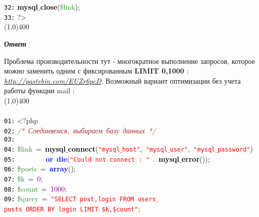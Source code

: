 \documentclass[a4paper,12pt]{article}
\begin{document}
\mbox{}\texttt{\textcolor{Black}{32:}} \textbf{\textcolor{Black}{mysql$\_$close}}\textcolor{BrickRed}{(}\textcolor{ForestGreen}{\$link}\textcolor{BrickRed}{);} \\
\mbox{}\texttt{\textcolor{Black}{33:}} \textcolor{BrickRed}{?\textgreater{}} \\
\line(1,0){400}
\begin{center}
\textit{\textbf{Ответ}}
\end{center}
Проблема производительности тут - многократное выполнение запросов, которое можно заменить одним с фиксированным \textbf{LIMIT 0,1000} : \href{http://pastebin.com/EUZr6pcD}{\textit{http://pastebin.com/EUZr6pcD}}.
Возможный вариант оптимизации без учета работы функции mail :
\\
\line(1,0){400}
\\
\\
\noindent
\mbox{}\texttt{\textcolor{Black}{01:}} \textcolor{BrickRed}{\textless{}?php} \\
\mbox{}\texttt{\textcolor{Black}{02:}} \textit{\textcolor{Brown}{/*\ Соединяемся,\ выбираем\ базу\ данных\ */}} \\
\mbox{}\texttt{\textcolor{Black}{03:}}  \\
\mbox{}\texttt{\textcolor{Black}{04:}} \textcolor{ForestGreen}{\$link}\ \textcolor{BrickRed}{=}\ \textbf{\textcolor{Black}{mysql$\_$connect}}\textcolor{BrickRed}{(}\texttt{\textcolor{Red}{"{}mysql$\_$host"{}}}\textcolor{BrickRed}{,}\ \texttt{\textcolor{Red}{"{}mysql$\_$user"{}}}\textcolor{BrickRed}{,}\ \texttt{\textcolor{Red}{"{}mysql$\_$password"{}}}\textcolor{BrickRed}{)} \\
\mbox{}\texttt{\textcolor{Black}{05:}} \ \ \ \ \ \ \ \ \textbf{\textcolor{Blue}{or}}\ \textbf{\textcolor{Blue}{die}}\textcolor{BrickRed}{(}\texttt{\textcolor{Red}{"{}Could\ not\ connect\ :\ "{}}}\ \textcolor{BrickRed}{.}\ \textbf{\textcolor{Black}{mysql$\_$error}}\textcolor{BrickRed}{());} \\
\mbox{}\texttt{\textcolor{Black}{06:}} \textcolor{ForestGreen}{\$posts}\ \textcolor{BrickRed}{=}\ \textbf{\textcolor{Blue}{array}}\textcolor{BrickRed}{();} \\
\mbox{}\texttt{\textcolor{Black}{07:}} \textcolor{ForestGreen}{\$k}\ \textcolor{BrickRed}{=}\ \textcolor{Purple}{0}\textcolor{BrickRed}{;} \\
\mbox{}\texttt{\textcolor{Black}{08:}} \textcolor{ForestGreen}{\$count}\ \textcolor{BrickRed}{=}\ \textcolor{Purple}{1000}\textcolor{BrickRed}{;} \\
\mbox{}\texttt{\textcolor{Black}{09:}} \textcolor{ForestGreen}{\$query}\ \textcolor{BrickRed}{=}\ \texttt{\textcolor{Red}{"{}SELECT\ post,login\ FROM\ users$\_$posts\ ORDER\ BY\ login\ LIMIT\ \$k,\$count"{}}}\textcolor{BrickRed}{;} \\
\end{document}
